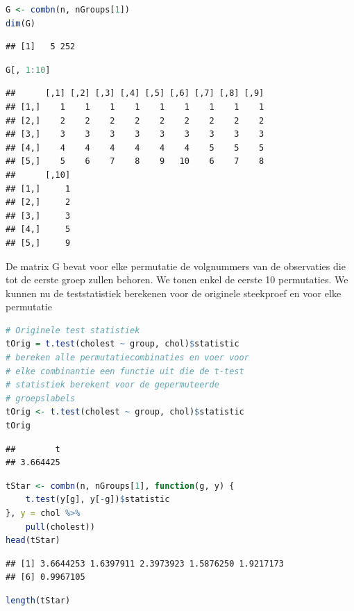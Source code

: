 \documentclass[
  12pt,dutch,coursenotes]{book}
\begin{document}
\begin{lstlisting}[language=R]
G <- combn(n, nGroups[1])
dim(G)
\end{lstlisting}

\begin{lstlisting}
## [1]   5 252
\end{lstlisting}

\begin{lstlisting}[language=R]
G[, 1:10]
\end{lstlisting}

\begin{lstlisting}
##      [,1] [,2] [,3] [,4] [,5] [,6] [,7] [,8] [,9]
## [1,]    1    1    1    1    1    1    1    1    1
## [2,]    2    2    2    2    2    2    2    2    2
## [3,]    3    3    3    3    3    3    3    3    3
## [4,]    4    4    4    4    4    4    5    5    5
## [5,]    5    6    7    8    9   10    6    7    8
##      [,10]
## [1,]     1
## [2,]     2
## [3,]     3
## [4,]     5
## [5,]     9
\end{lstlisting}

De matrix G bevat voor elke permutatie de volgnummers van de observaties die tot de eerste groep zullen behoren.
We tonen enkel de eerste 10 permutaties.
We kunnen nu de teststatistiek berekenen voor de originele steekproef en voor elke permutatie

\begin{lstlisting}[language=R]
# Originele test statistiek
tOrig = t.test(cholest ~ group, chol)$statistic
# bereken alle permutatiecombinaties en voer voor
# elke combinantie een functie uit die de t-test
# statistiek berekent voor de gepermuteerde
# groepslabels
tOrig <- t.test(cholest ~ group, chol)$statistic
tOrig
\end{lstlisting}

\begin{lstlisting}
##        t 
## 3.664425
\end{lstlisting}

\begin{lstlisting}[language=R]
tStar <- combn(n, nGroups[1], function(g, y) {
    t.test(y[g], y[-g])$statistic
}, y = chol %>%
    pull(cholest))
head(tStar)
\end{lstlisting}

\begin{lstlisting}
## [1] 3.6644253 1.6397911 2.3973923 1.5876250 1.9217173
## [6] 0.9967105
\end{lstlisting}

\begin{lstlisting}[language=R]
length(tStar)
\end{lstlisting}
\end{document}

